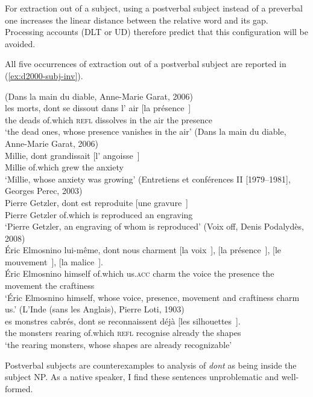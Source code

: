 For extraction out of a subject, using a postverbal subject instead of a preverbal one increases the linear distance between the relative word and its gap. Processing accounts (DLT or UD) therefore predict that this configuration will be avoided.

All five occurrences of extraction out of a postverbal subject are reported in (\ref{ex:d2000-subj-inv}).\largerpage[2]

\eal \label{ex:d2000-subj-inv}
\ex (Dans la main du diable, Anne-Marie Garat, 2006)\\
\gll les morts, dont se dissout dans l' air [la présence~\trace{}]\\
the deads of.which \textsc{refl} dissolves in the air the presence\\
\glt `the dead ones, whose presence vanishes in the air'
\ex (Dans la main du diable, Anne-Marie Garat, 2006)\\
\gll Millie, dont grandissait [l' angoisse~\trace{}]\\
Millie of.which grew the anxiety\\
\glt `Millie, whose anxiety was growing'
\ex (Entretiens et conférences II [1979--1981], Georges Perec, 2003)\\
\gll Pierre Getzler, dont est reproduite [une gravure~\trace{}]\\
Pierre Getzler of.which is reproduced an engraving\\
\glt `Pierre Getzler, an engraving of whom is reproduced'
\ex (Voix off, Denis Podalydès, 2008)\\
\gll Éric Elmosnino lui-même, dont nous charment [la voix~\trace{}], [la présence~\trace{}], [le mouvement~\trace{}], [la malice~\trace{}].\\
Éric Elmosnino himself of.which us\textsc{.acc} charm the voice the presence the movement the craftiness\\
\glt `Éric Elmosnino himself, whose voice, presence, movement and craftiness charm us.'
\ex (L'Inde (sans les Anglais), Pierre Loti, 1903)\\
\gll [l]es monstres cabrés, dont se reconnaissent déjà [les silhouettes~\trace{}].\\
the monsters rearing of.which \textsc{refl} recognise already the shapes\\
\glt `the rearing monsters, whose shapes are already recognizable'
\label{ex:d1900-subj-inv}
\zl 

Postverbal subjects are counterexamples to  analysis of \emph{dont} as being inside the subject NP. As a native speaker, I find these sentences unproblematic and well-formed.

